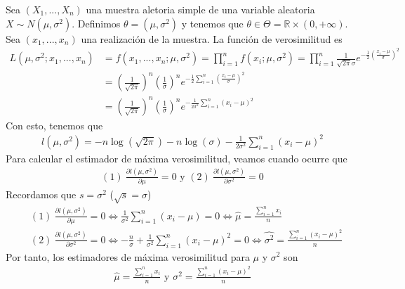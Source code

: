 \begin{ejemplo}
    Sea $(X_1,...,X_n)$ una muestra aletoria simple de una variable aleatoria $X \sim N(\mu,\sigma^2)$. Definimos $\theta = (\mu,\sigma^2)$ y tenemos que $\theta \in \Theta = \mathbb{R}\times(0,+\infty)$. Sea $(x_1,...,x_n)$ una realización de la muestra. La función de verosimilitud es
    \begin{align*}
        L(\mu,\sigma^2;x_1,...,x_n) & = f(x_1,...,x_n;\mu,\sigma^2) = \prod_{i=1}^{n}{f(x_i;\mu,\sigma^2)}
        = \prod_{i=1}^{n}{\frac{1}{\sqrt{2\pi}\sigma}}e^{-\frac{1}{2}\left( \frac{x_i -\mu}{\sigma} \right)^2}                                                                            \\
                                    & = \left( \frac{1}{\sqrt{2\pi}} \right)^n \left( \frac{1}{\sigma} \right)^n e^{-\frac{1}{2}\sum_{i=1}^{n}{\left( \frac{x_i -\mu}{\sigma} \right)^2}} \\
                                    & = \left( \frac{1}{\sqrt{2\pi}} \right)^n \left( \frac{1}{\sigma} \right)^n e^{-\frac{1}{2\sigma^2}\sum_{i=1}^{n}{\left( x_i -\mu \right)^2}}
    \end{align*}
    Con esto, tenemos que
    \begin{align*}
        l(\mu,\sigma^2) = -n\log(\sqrt{2\pi}) -n\log(\sigma) - \frac{1}{2\sigma^2}\sum_{i=1}^{n}{\left( x_i -\mu \right)^2}
    \end{align*}
    Para calcular el estimador de máxima verosimilitud, veamos cuando ocurre que
    \begin{align*}
        (1) \ \frac{\partial l(\mu,\sigma^2)}{\partial \mu} = 0 \text{ \ \ \ y \ \ \ } (2) \ \frac{\partial l(\mu,\sigma^2)}{\partial \sigma^2} = 0
    \end{align*}
    Recordamos que $s = \sigma^2$ ($\sqrt{s} = \sigma$)
    \begin{align*}
         & (1) \ \frac{\partial l(\mu,\sigma^2)}{\partial \mu} = 0 \Longleftrightarrow \frac{1}{\sigma^2}\sum_{i=1}^{n}{(x_i -\mu)} = 0 \Longleftrightarrow \hat{\mu} = \frac{\sum_{i=1}^{n}{x_i}}{n}                                          \\
         & (2) \ \frac{\partial l(\mu,\sigma^2)}{\partial \sigma^2} = 0 \Longleftrightarrow -\frac{n}{\sigma} + \frac{1}{\sigma^2}\sum_{i=1}^{n}{(x_i -\mu)^2} = 0 \Longleftrightarrow \hat{\sigma^2} = \frac{\sum_{i=1}^{n}{(x_i -\mu)^2}}{n}
    \end{align*}
    Por tanto, los estimadores de máxima verosimilitud para $\mu$ y $\sigma^2$ son
    \begin{align*}
        \hat{\mu} = \frac{\sum_{i=1}^{n}{x_i}}{n} \text{ \ \ \ y \ \ \ } \hat{\sigma^2} = \frac{\sum_{i=1}^{n}{(x_i -\mu)^2}}{n}
    \end{align*}
\end{ejemplo}

